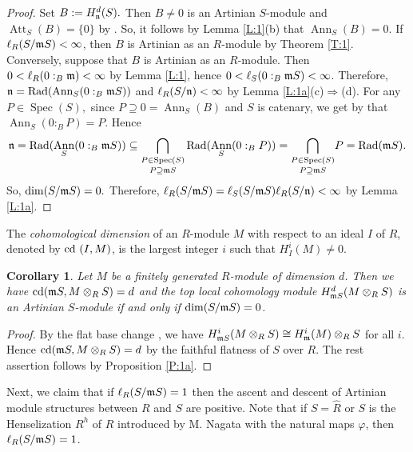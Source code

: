 \documentclass[a4papersize]{article}
\newtheorem{corollary}[theorem]{Corollary}
\DeclareMathOperator{\Ann}{Ann}
\DeclareMathOperator{\Rad}{Rad}
\DeclareMathOperator{\Att}{Att}
\DeclareMathOperator{\Spec}{Spec}
\begin{document}
\begin{proof} Set $B:=H^d_{\frak n}(S).$ Then $B\neq 0$ is an Artinian $S$-module and $\Att_S(B)=\{0\}$ by \cite[Theorem 7.3.2]{BS}. So, it follows by Lemma \ref{L:1}(b) that $\Ann_S(B)=0.$  If $\ell_R(S/\frak mS)<\infty$, then $B$ is  Artinian as an $R$-module by Theorem \ref{T:1}. Conversely, suppose that $B$ is Artinian as an $R$-module. Then $0<\ell_R(0:_B\frak m)<\infty$ by Lemma \ref{L:1}, hence $0<\ell_S(0:_B\frak mS)<\infty$. Therefore, $\frak n=\Rad(\Ann_S(0:_B\frak mS))$ and $\ell_R(S/\frak n)<\infty$ by Lemma \ref{L:1a}(c)$\Rightarrow$(d).  For any $P\in\Spec(S),$ since $P\supseteq 0=\Ann_S(B)$ and $S$ is catenary, we get by \cite[Theorem 4.1]{CDN} that $\Ann_S(0:_BP)=P.$ Hence 
$$\frak n=\Rad(\Ann_S(0:_B\frak mS))\subseteq \underset{P\supseteq \frak mS}{\underset{P\in\Spec(S)}{\bigcap}}\Rad(\Ann_S(0:_BP))=\underset{P\supseteq \frak mS}{\underset{P\in\Spec(S)}{\bigcap}}P=\Rad (\frak mS).$$ So, $\dim (S/\frak mS)=0.$ Therefore, $\ell_R(S/\frak mS)=\ell_S(S/\frak mS)\ell_R(S/\frak n)<\infty$ by Lemma \ref{L:1a}.
\end{proof}

 The {\it cohomological dimension} of an $R$-module $M$ with respect to an ideal $I$ of $R$, denoted by ${\rm cd}\ (I, M)$, is the largest integer $i$ such that $H^i_I(M)\neq 0$. 

\begin{corollary}\label{C:2}  Let $M$ be a finitely generated $R$-module of dimension $d$. Then  we have ${\rm cd}(\frak mS, M\otimes_RS)=d$ and  the top local cohomology module $H^d_{\frak mS}(M\otimes_RS)$ is  an Artinian $S$-module if and only if $\dim (S/\frak mS)=0$. 
\end{corollary}

\begin{proof} By the flat base change  \cite[Theorem 4.3.2]{BS}, we have $H^i_{\frak mS}(M\otimes_RS)\cong H^i_{\frak m}(M)\otimes_RS$ for all $i$. Hence ${\rm cd}(\frak mS, M\otimes_RS)=d$ by the faithful flatness of $S$ over $R$. The rest assertion follows by Proposition \ref{P:1a}.  
\end{proof}

 Next, we claim that if $\ell_R(S/\frak mS)=1$ then the ascent and descent of Artinian module structures between $R$ and $S$ are positive.  Note that  if $S=\widehat R$ or $S$ is the Henselization $R^h$ of $R$ introduced by M. Nagata \cite{Na} with the natural maps $\varphi$, then $\ell_R(S/\frak mS)=1$.
\end{document}
